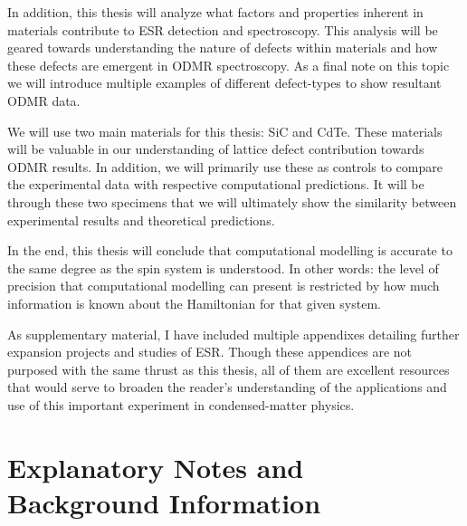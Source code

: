 \documentclass[oneside, astronomy, noacknowlegments]{BYUPhys}
\begin{document}
In addition, this thesis will analyze what factors and properties inherent in materials contribute to ESR detection and spectroscopy. This analysis will be geared towards understanding the nature of defects within materials and how these defects are emergent in ODMR spectroscopy. As a final note on this topic we will introduce multiple examples of different defect-types to show resultant ODMR data.

We will use two main materials for this thesis: SiC and CdTe. These materials will be valuable in our understanding of lattice defect contribution towards ODMR results. In addition, we will primarily use these as controls to compare the experimental data with respective computational predictions. It will be through these two specimens that we will ultimately show the similarity between experimental results and theoretical predictions.

In the end, this thesis will conclude that computational modelling is accurate to the same degree as the spin system is understood. In other words: the level of precision that computational modelling can present is restricted by how much information is known about the Hamiltonian for that given system.

As supplementary material, I have included multiple appendixes detailing further expansion projects and studies of ESR. Though these appendices are not purposed with the same thrust as this thesis, all of them are excellent resources that would serve to broaden the reader's understanding of the applications and use of this important experiment in condensed-matter physics.

\section{Explanatory Notes and Background Information}
\end{document}
